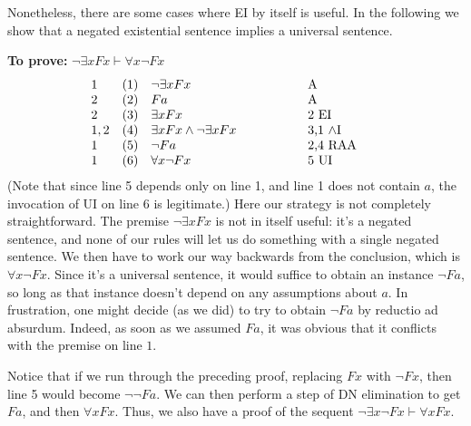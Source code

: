 Nonetheless, there are some cases where EI by itself is useful.  In
the following we show that a negated existential sentence implies a
universal sentence. \label{qne}

\medskip\noindent\textbf{To prove:} $\neg\exists xFx\vdash\forall x\neg Fx$
\[ \begin{array}{l l >{$}p{4cm}<{$} p{2cm}}
     1 & (1) & \neg\exists xFx & A \\
     2 & (2) & Fa              & A \\
     2 & (3) & \exists xFx     & 2 EI \\
     1,2 & (4) & \exists xFx\wedge\neg\exists xFx & 3,1 $\wedge$I \\
     1   & (5) & \neg Fa     & 2,4 RAA \\
     1   & (6) & \forall x\neg Fx  & 5 UI \end{array} \]
(Note that since line 5 depends only on line 1, and line 1 does not
contain $a$, the invocation of UI on line 6 is legitimate.)  Here our
strategy is not completely straightforward.  The premise $\neg\exists
xFx$ is not in itself useful: it's a negated sentence, and none of our
rules will let us do something with a single negated sentence.  We
then have to work our way backwards from the conclusion, which is
$\forall x\neg Fx$.  Since it's a universal sentence, it would suffice
to obtain an instance $\neg Fa$, so long as that instance doesn't
depend on any assumptions about $a$.  In frustration, one might decide
(as we did) to try to obtain $\neg Fa$ by reductio ad absurdum.
Indeed, as soon as we assumed $Fa$, it was obvious that it conflicts
with the premise on line $1$.

Notice that if we run through the preceding proof, replacing $Fx$ with
$\neg Fx$, then line 5 would become $\neg\neg Fa$.  We can then perform a
step of DN elimination to get $Fa$, and then $\forall xFx$.  Thus, we also
have a proof of the sequent $\neg\exists x\neg Fx\vdash\forall xFx$.


